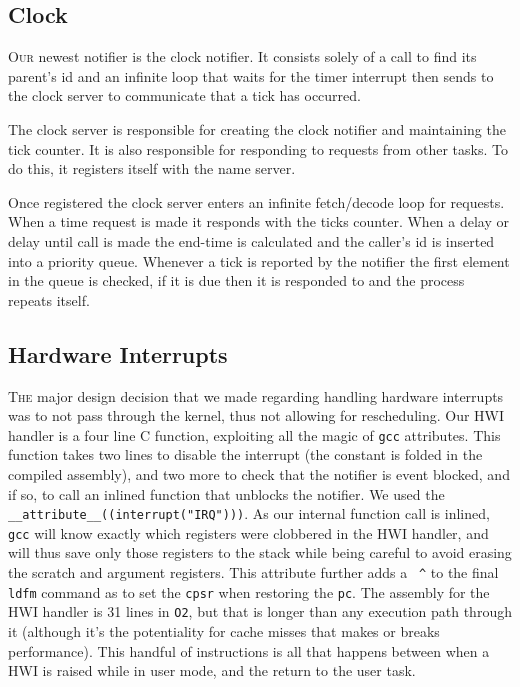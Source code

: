 \documentclass{article}
\begin{document}
\subsection*{Clock}

\textsc{Our} newest notifier is the clock notifier. It consists solely of a call to find
its parent's id and an infinite loop that waits for the timer interrupt then
sends to the clock server to communicate that a tick has occurred.

The clock server is responsible for creating the clock notifier and maintaining
the tick counter. It is also responsible for responding to requests from other
tasks. To do this, it registers itself with the name server.

Once registered the clock server enters an infinite fetch/decode loop for
requests. When a time request is made it responds with the ticks counter. When a
delay or delay until call is made the end-time is calculated and the caller's id
is inserted into a priority queue. Whenever a tick is reported by the notifier
the first element in the queue is checked, if it is due then it is responded to
and the process repeats itself.

\subsection*{Hardware Interrupts}

\textsc{The} major design decision that we made regarding handling hardware
interrupts was to not pass through the kernel, thus not allowing for
rescheduling. Our HWI handler is a four line C function, exploiting all the
magic of \texttt{gcc} attributes. This function takes two lines to disable the
interrupt (the constant is folded in the compiled assembly), and two more to
check that the notifier is event blocked, and if so, to call an inlined function
that unblocks the notifier. We used the
\texttt{\_\_attribute\_\_((interrupt("IRQ")))}. As our internal function call is
inlined, \texttt{gcc} will know exactly which registers were clobbered in the
HWI handler, and will thus save only those registers to the stack while being
careful to avoid erasing the scratch and argument registers. This attribute
further adds a~ \texttt{\^} to the final \texttt{ldfm} command as to set the
\texttt{cpsr} when restoring the \texttt{pc}. The assembly for the HWI handler
is 31 lines in \texttt{O2}, but that is longer than any execution path through
it (although it's the potentiality for cache misses that makes or breaks
performance). This handful of instructions is all that happens between when a
HWI is raised while in user mode, and the return to the user task.
\end{document}
